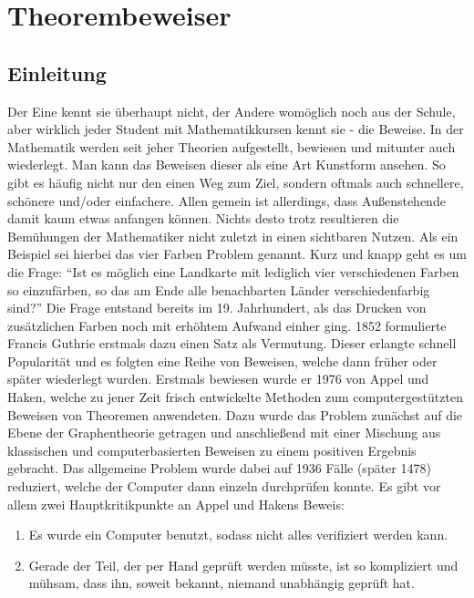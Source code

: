 
\chapter{Theorembeweiser}
\section{Einleitung}
Der Eine kennt sie überhaupt nicht, der Andere womöglich noch aus der Schule, aber wirklich
jeder Student mit Mathematikkursen kennt sie - die Beweise.
In der Mathematik werden seit jeher Theorien aufgestellt, bewiesen und mitunter auch wiederlegt.
Man kann das Beweisen dieser als eine Art Kunstform ansehen.
So gibt es häufig nicht nur den einen Weg zum Ziel, sondern oftmals auch schnellere, schönere und/oder einfachere.
Allen gemein ist allerdings, dass Außenstehende damit kaum etwas anfangen können. Nichts desto trotz resultieren die Bemühungen der Mathematiker nicht zuletzt in einen sichtbaren Nutzen.
Als ein Beispiel sei hierbei das vier Farben Problem genannt. Kurz und knapp geht es um die Frage: \enquote{Ist es möglich eine Landkarte mit lediglich vier verschiedenen Farben so einzufärben, so das am Ende alle benachbarten Länder verschiedenfarbig sind?}
Die Frage entstand bereits im 19. Jahrhundert, als das Drucken von zusätzlichen Farben noch mit erhöhtem Aufwand einher ging. 1852 formulierte Francis Guthrie erstmals dazu einen Satz als Vermutung. Dieser erlangte schnell Popularität und es folgten eine Reihe von Beweisen, welche dann früher oder später wiederlegt wurden. Erstmals bewiesen wurde er 1976 von Appel und Haken, welche zu jener Zeit frisch entwickelte Methoden zum computergestützten Beweisen von Theoremen anwendeten. Dazu wurde das Problem zunächst auf die Ebene der Graphentheorie getragen und anschließend mit einer Mischung aus klassischen und computerbasierten Beweisen zu einem positiven Ergebnis gebracht. Das allgemeine Problem wurde dabei auf 1936 Fälle (später 1478) reduziert, welche der Computer dann einzeln durchprüfen konnte. Es gibt vor allem zwei Hauptkritikpunkte an Appel und Hakens Beweis:
\begin{enumerate}
\item Es wurde ein Computer benutzt, sodass nicht alles verifiziert werden kann.
\item  Gerade der Teil, der per Hand geprüft werden müsste, ist so kompliziert und
mühsam, dass ihn, soweit bekannt, niemand unabhängig geprüft hat.
\end{enumerate}
